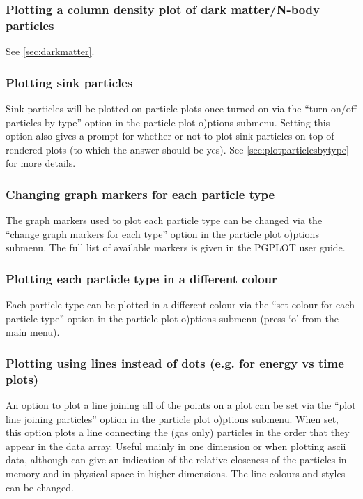 \documentclass[a4paper,11pt]{article}
\begin{document}
\subsubsection{ Plotting a column density plot of dark matter/N-body particles}
 See \ref{sec:darkmatter}.

\subsubsection{ Plotting sink particles}
 Sink particles will be plotted on particle plots once turned on via the ``turn on/off particles by type'' option in the particle plot o)ptions submenu. Setting this option also gives a prompt for whether or not to plot sink particles on top of rendered plots (to which the answer should be yes).  See \ref{sec:plotparticlesbytype} for more details.

\subsubsection{ Changing graph markers for each particle type}
 The graph markers used to plot each particle type can be changed via the ``change graph markers for each type'' option in the particle plot o)ptions submenu. The full list of available markers is given in the PGPLOT user guide. 

\subsubsection{ Plotting each particle type in a different colour}
\label{sec:partcolours}
 Each particle type can be plotted in a different colour via the ``set colour for each particle type'' option in the particle plot o)ptions submenu (press `o' from the main menu).

\subsubsection{ Plotting using lines instead of dots (e.g. for energy vs time plots)}
\label{sec:lines}
 An option to plot a line joining all of the points on a plot can be set via the ``plot line joining particles'' option in the particle plot o)ptions submenu. When set, this option plots a line connecting the (gas only) particles
in the order that they appear in the data array. Useful mainly in one dimension or when plotting ascii data, although can give an indication of the relative closeness of the particles in memory and in physical space in higher dimensions. The line colours and styles can be changed.
\end{document}
